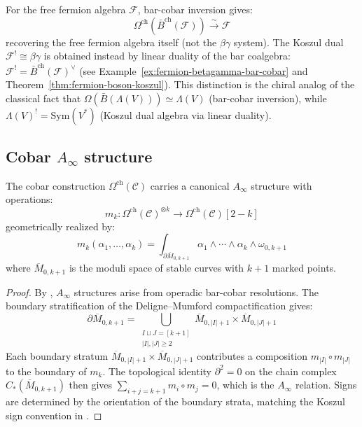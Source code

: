 \begin{example}\label{ex:cobar-bar-fermion}
For the free fermion algebra $\mathcal{F}$, bar-cobar inversion gives:
\[
\Omega^{\text{ch}}(\bar{B}^{\text{ch}}(\mathcal{F})) \xrightarrow{\sim} \mathcal{F}
\]
recovering the free fermion algebra itself (not the $\beta\gamma$ system).  The Koszul dual $\mathcal{F}^! \cong \beta\gamma$ is obtained instead by linear duality of the bar coalgebra: $\mathcal{F}^! = \bar{B}^{\text{ch}}(\mathcal{F})^\vee$ (see Example~\ref{ex:fermion-betagamma-bar-cobar} and Theorem~\ref{thm:fermion-boson-koszul}).  This distinction is the chiral analog of the classical fact that $\Omega(\bar{B}({\Lambda}(V))) \simeq {\Lambda}(V)$ (bar-cobar inversion), while ${\Lambda}(V)^! = \mathrm{Sym}(V^*)$ (Koszul dual algebra via linear duality).
\end{example}


\subsection{\texorpdfstring{Cobar $A_\infty$ structure}{Cobar A-infinity structure}}

\begin{theorem}\label{thm:cobar-ainfty}
The cobar construction $\Omega^{\text{ch}}(\mathcal{C})$ carries a canonical $A_\infty$ structure with operations:
\[
m_k: \Omega^{\text{ch}}(\mathcal{C})^{\otimes k} \to \Omega^{\text{ch}}(\mathcal{C})[2-k]
\]
geometrically realized by:
\[
m_k(\alpha_1, \ldots, \alpha_k) = \int_{\partial \overline{M}_{0,k+1}} \alpha_1 \wedge \cdots \wedge \alpha_k \wedge \omega_{0,k+1}
\]
where $\overline{M}_{0,k+1}$ is the moduli space of stable curves with $k+1$ marked points.
\end{theorem}

\begin{proof}
By \cite[Theorem~9.2.8]{LV12}, $A_\infty$ structures arise from operadic bar-cobar resolutions.
The boundary stratification of the Deligne--Mumford compactification gives:
\[
\partial \overline{M}_{0,k+1} = \bigcup_{\substack{I \sqcup J = [k+1] \\ |I|,|J| \geq 2}} \overline{M}_{0,|I|+1} \times \overline{M}_{0,|J|+1}
\]
Each boundary stratum $\overline{M}_{0,|I|+1} \times \overline{M}_{0,|J|+1}$ contributes a composition $m_{|I|} \circ m_{|J|}$ to the boundary of $m_k$. The topological identity $\partial^2 = 0$ on the chain complex $C_*(\overline{M}_{0,k+1})$ then gives $\sum_{i+j=k+1} m_i \circ m_j = 0$, which is the $A_\infty$ relation. Signs are determined by the orientation of the boundary strata, matching the Koszul sign convention in \cite[\S10.3]{LV12}.
\end{proof}

